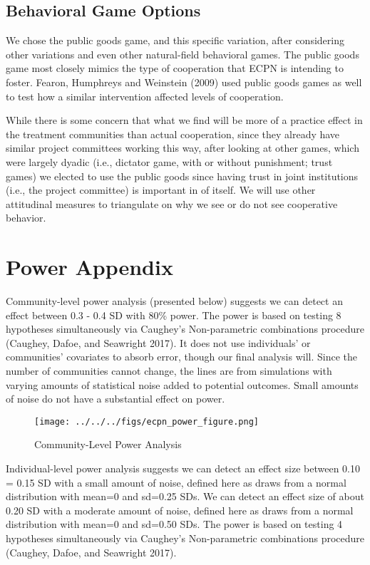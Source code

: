 \documentclass[
]{article}
\begin{document}
\hypertarget{behavioral-game-options}{%
\subsection{Behavioral Game Options}\label{behavioral-game-options}}

We chose the public goods game, and this specific variation, after
considering other variations and even other natural-field behavioral
games. The public goods game most closely mimics the type of cooperation
that ECPN is intending to foster. Fearon, Humphreys and Weinstein (2009)
used public goods games as well to test how a similar intervention
affected levels of cooperation.

While there is some concern that what we find will be more of a practice
effect in the treatment communities than actual cooperation, since they
already have similar project committees working this way, after looking
at other games, which were largely dyadic (i.e., dictator game, with or
without punishment; trust games) we elected to use the public goods
since having trust in joint institutions (i.e., the project committee)
is important in of itself. We will use other attitudinal measures to
triangulate on why we see or do not see cooperative behavior.

\hypertarget{power-appendix}{%
\section{Power Appendix}\label{power-appendix}}

Community-level power analysis (presented below) suggests we can detect
an effect between 0.3 - 0.4 SD with 80\% power. The power is based on
testing 8 hypotheses simultaneously via Caughey's Non-parametric
combinations procedure (Caughey, Dafoe, and Seawright 2017). It does not
use individuals' or communities' covariates to absorb error, though our
final analysis will. Since the number of communities cannot change, the
lines are from simulations with varying amounts of statistical noise
added to potential outcomes. Small amounts of noise do not have a
substantial effect on power.

\begin{figure}
\centering
\texttt{[image: ../../../figs/ecpn\_power\_figure.png]}
\caption{Community-Level Power Analysis}
\end{figure}

Individual-level power analysis suggests we can detect an effect size
between 0.10 = 0.15 SD with a small amount of noise, defined here as
draws from a normal distribution with mean=0 and sd=0.25 SDs. We can
detect an effect size of about 0.20 SD with a moderate amount of noise,
defined here as draws from a normal distribution with mean=0 and sd=0.50
SDs. The power is based on testing 4 hypotheses simultaneously via
Caughey's Non-parametric combinations procedure (Caughey, Dafoe, and
Seawright 2017).
\end{document}
